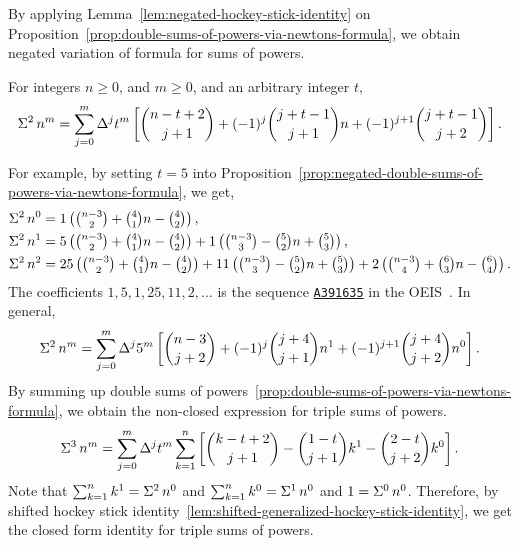 By applying Lemma~\eqref{lem:negated-hockey-stick-identity}
on Proposition~\eqref{prop:double-sums-of-powers-via-newtons-formula},
we obtain negated variation of formula for sums of powers.

\begin{proposition}
  \label{prop:negated-double-sums-of-powers-via-newtons-formula}
  For integers $n\geq 0$, and $m\geq 0$, and an arbitrary integer $t$,
  \begin{align*}
    \Sigma^{2}\,{n}^{m}
    = \sum_{j=0}^{m} \Delta^{j} t^m
    \left[
      \binom{n-t+2}{j+1} + (-1)^j \binom{j+t-1}{j+1} n
      + (-1)^{j+1} \binom{j+t-1}{j+2}
    \right].
  \end{align*}
\end{proposition}

For example, by setting $t=5$ into
Proposition~\eqref{prop:negated-double-sums-of-powers-via-newtons-formula},
we get,
\begin{align*}
  \Sigma^{2}\,{n}^{0}
  &= 1 \left( \tbinom{n-3}{2} + \tbinom{4}{1} n - \tbinom{4}{2} \right),
  \\
  \Sigma^{2}\,{n}^{1}
  &= 5 \left( \tbinom{n-3}{2} + \tbinom{4}{1} n - \tbinom{4}{2} \right)
  + 1 \left( \tbinom{n-3}{3} - \tbinom{5}{2} n + \tbinom{5}{3} \right),
  \\
  \Sigma^{2}\,{n}^{2}
  &= 25 \left( \tbinom{n-3}{2} + \tbinom{4}{1} n - \tbinom{4}{2} \right)
  + 11 \left( \tbinom{n-3}{3} - \tbinom{5}{2} n + \tbinom{5}{3} \right)
  + 2 \left( \tbinom{n-3}{4} + \tbinom{6}{3} n - \tbinom{6}{4} \right).
\end{align*}
The coefficients $1,5,1,25,11,2,\dots$ is the sequence
\href{https://oeis.org/A391635}{\texttt{A391635}}
in the OEIS~\cite{sloane2003line}.
In general,
\begin{align*}
  \Sigma^{2}\,{n}^{m}
  = \sum_{j=0}^{m} \Delta^{j} 5^{m}
  \left[
    \binom{n-3}{j+2} + (-1)^{j} \binom{j+4}{j+1} n^1
    + (-1)^{j+1} \binom{j+4}{j+2} n^0
  \right].
\end{align*}
By summing up double sums of
powers~\eqref{prop:double-sums-of-powers-via-newtons-formula},
we obtain the non-closed expression for triple sums of powers.
\begin{align*}
  \Sigma^{3}\,{n}^{m}
  = \sum_{j=0}^{m} \Delta^{j} t^m \sum_{k=1}^{n}
  \left[
    \binom{k-t+2}{j+1} - \binom{1-t}{j+1} k^1 - \binom{2-t}{j+2} k^0
  \right].
\end{align*}
Note that $\sum_{k=1}^{n} k^1
= \Sigma^{2}\,{n}^{0} $ and $\sum_{k=1}^{n} k^0 = \Sigma^{1}\,{n}^{0}$
and $1 = \Sigma^{0}\,{n}^{0}$.
Therefore, by shifted hockey stick
identity~\eqref{lem:shifted-generalized-hockey-stick-identity}, we get
the closed form identity for triple sums of powers.

